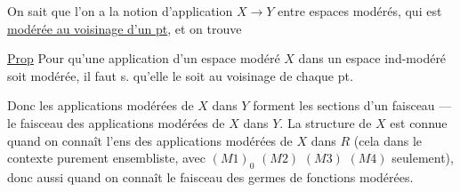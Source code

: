 On sait  que l'on a la notion d'application $X\longrightarrow Y$ entre espaces modérés, qui est \uline{modérée au voisinage d'un pt}, et on trouve

\uline{Prop} Pour qu'une application d'un espace modéré $X$ dans un espace ind-modéré soit modérée, il faut s. qu'elle le soit au voisinage de chaque pt.

Donc les applications modérées de $X$ dans $Y$ forment les sections d'un faisceau --- le faisceau des applications modérées de $X$ dans $Y$. La structure  de $X$ est connue quand on connaît l'ens des applications modérées de $X$ dans $R$ (cela  dans le contexte purement ensembliste, avec $(M1)_0$ $(M2)$ $(M3)$ $(M4)$ seulement), donc aussi quand on connaît le faisceau des germes de fonctions modérées.
